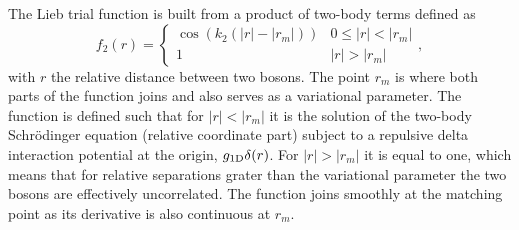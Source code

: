The Lieb trial function is built from a product of two-body terms defined as
%
\begin{equation}
	\label{eq:vmc-lieb-two-body-function}
	f_2(r) = \begin{cases}
	\cos(k_2(|r| - |r_m|)) & 0 \leq |r| < |r_m| \\ 1 & |r| > |r_m|
	\end{cases},
\end{equation}
%
with $r$ the relative distance between two bosons. The point $r_m$ is where both
parts of the function joins and also serves as a variational parameter. The
function is defined such that for $|r| < |r_m|$ it is the solution of the
two-body Schrödinger equation (relative coordinate part) subject to a repulsive
delta interaction potential at the origin, $g_{ \mathrm{1D} } \delta(r)$. For $|r| >
|r_m|$ it is equal to one, which means that for relative separations grater than
the variational parameter the two bosons are effectively uncorrelated. The
function joins smoothly at the matching point as its derivative is also
continuous at $r_m$.

